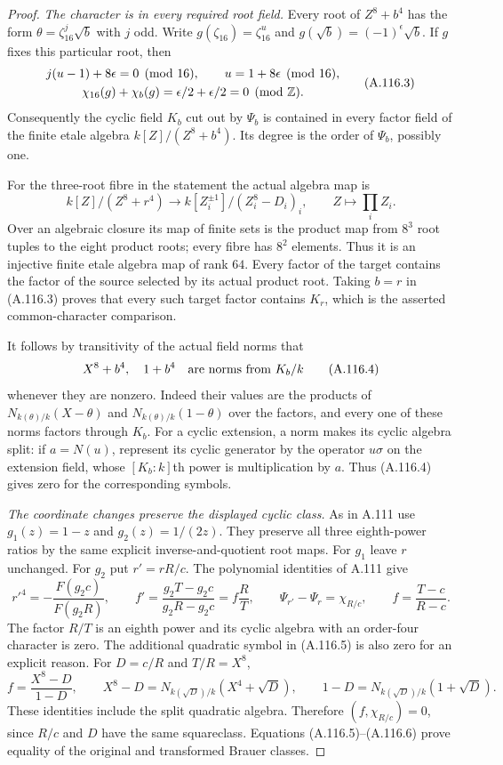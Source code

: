 \begin{proof}
\emph{The character is in every required root field.}
Every root of $Z^8+b^4$ has the form
$\theta=\zeta_{16}^j\sqrt b$ with $j$ odd.
Write
$g(\zeta_{16})=\zeta_{16}^u$ and
$g(\sqrt b)=(-1)^\epsilon\sqrt b$.
If $g$ fixes this particular root, then
\[
 \begin{gathered}
 j(u-1)+8\epsilon=0\pmod{16},
 \qquad u=1+8\epsilon\pmod{16},\\
            \chi_{16}(g)+\chi_b(g)=
                 \epsilon/2+\epsilon/2=0\pmod{\mathbb Z}.
 \end{gathered}
\tag{A.116.3}
\]
Consequently the cyclic field $K_b$ cut out
by $\Psi_b$ is contained in every factor field of
the finite etale algebra $k[Z]/(Z^8+b^4)$.
Its degree is the order of $\Psi_b$, possibly one.

For the three-root fibre in the statement the actual
algebra map is
\[
 k[Z]/(Z^8+r^4)\longrightarrow
       k[Z_i^{\pm1}]/(Z_i^8-D_i)_i,
                     \qquad Z\longmapsto\prod_iZ_i.
\tag{A.116.3a}
\]
Over an algebraic closure its map of finite sets is
the product map from $8^3$ root tuples to the eight
product roots; every fibre has $8^2$ elements.
Thus it is an injective finite etale algebra map of
rank $64$.
Every factor of the target contains the factor of
the source selected by its actual product root.
Taking $b=r$ in (A.116.3) proves that every such target
factor contains $K_r$, which is the asserted
common-character comparison.

It follows by transitivity of the actual field norms that
\[
                       X^8+b^4,\quad 1+b^4
               \quad\hbox{are norms from }K_b/k
\tag{A.116.4}
\]
whenever they are nonzero.
Indeed their values are the products of
$N_{k(\theta)/k}(X-\theta)$ and
$N_{k(\theta)/k}(1-\theta)$ over the factors,
and every one of these norms factors through $K_b$.
For a cyclic extension, a norm makes its cyclic
algebra split: if $a=N(u)$, represent its cyclic
generator by the operator $u\sigma$ on the extension
field, whose $[K_b:k]$th power is multiplication by $a$.
Thus (A.116.4) gives zero for the corresponding symbols.

\emph{The coordinate changes preserve the displayed cyclic class.}
As in A.111 use
$g_1(z)=1-z$ and $g_2(z)=1/(2z)$.
They preserve all three eighth-power ratios by
the same explicit inverse-and-quotient root maps.
For $g_1$ leave $r$ unchanged.
For $g_2$ put $r'=rR/c$.
The polynomial identities of A.111 give
\[
 r'^4=-\frac{F(g_2c)}{F(g_2R)},\qquad
 f'=\frac{g_2T-g_2c}{g_2R-g_2c}
                  =f\frac RT,\qquad
 \Psi_{r'}-\Psi_r=\chi_{R/c},
        \qquad f=\frac{T-c}{R-c}.
\tag{A.116.5}
\]
The factor $R/T$ is an eighth power and its cyclic
algebra with an order-four character is zero.
The additional quadratic symbol in (A.116.5) is also
zero for an explicit reason.
For $D=c/R$ and $T/R=X^8$,
\[
 f=\frac{X^8-D}{1-D},\qquad
 X^8-D=N_{k(\sqrt D)/k}(X^4+\sqrt D),\qquad
 1-D=N_{k(\sqrt D)/k}(1+\sqrt D).
\tag{A.116.6}
\]
These identities include the split quadratic algebra.
Therefore $(f,\chi_{R/c})=0$, since $R/c$ and $D$
have the same squareclass.
Equations (A.116.5)--(A.116.6) prove equality of the
original and transformed Brauer classes.


\end{proof}
